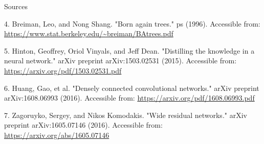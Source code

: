 \documentclass{beamer}
\begin{document}
\begin{frame}{Sources}

\begin{thebibliography}{0}
   4. Breiman, Leo, and Nong Shang. "Born again trees." ps (1996). Accessible from: \url{https://www.stat.berkeley.edu/~breiman/BAtrees.pdf}
  
   5. Hinton, Geoffrey, Oriol Vinyals, and Jeff Dean. "Distilling the knowledge in a neural network." arXiv preprint arXiv:1503.02531 (2015). Accessible from: \url{https://arxiv.org/pdf/1503.02531.pdf}
  
   6. Huang, Gao, et al. "Densely connected convolutional networks." arXiv preprint arXiv:1608.06993 (2016). Accessible from: \url{https://arxiv.org/pdf/1608.06993.pdf}
  
   7. Zagoruyko, Sergey, and Nikos Komodakis. "Wide residual networks." arXiv preprint arXiv:1605.07146 (2016). Accessible from: \url{https://arxiv.org/abs/1605.07146}
\end{thebibliography}

\end{frame}
 
 
 
\end{document}

